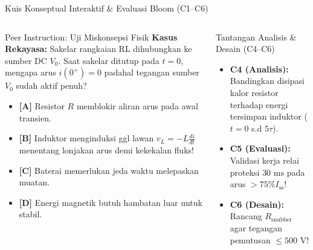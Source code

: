 \documentclass[aspectratio=169,10pt]{beamer}
\begin{document}
\begin{frame}{Kuis Konseptual Interaktif \& Evaluasi Bloom (C1--C6)}
  \begin{columns}[t]
    \begin{alertblock}{Peer Instruction: Uji Miskonsepsi Fisik}
      \footnotesize
      \textbf{Kasus Rekayasa:} Sakelar rangkaian RL dihubungkan ke sumber DC $V_0$. Saat sakelar ditutup pada $t=0$, mengapa arus $i(0^+) = 0$ padahal tegangan sumber $V_0$ sudah aktif penuh?
      \vspace{0.05cm}
      \begin{itemize}\setlength{\itemsep}{1pt}
        \item \textbf{[A]} Resistor $R$ memblokir aliran arus pada awal transien.
        \item \textbf{[B]} Induktor menginduksi ggl lawan $v_L = -L \frac{di}{dt}$ menentang lonjakan arus demi kekekalan fluks!
        \item \textbf{[C]} Baterai memerlukan jeda waktu melepaskan muatan.
        \item \textbf{[D]} Energi magnetik butuh hambatan luar untuk stabil.
      \end{itemize}
    \end{alertblock}

    \begin{block}{Tantangan Analisis \& Desain (C4--C6)}
      \footnotesize
      \begin{itemize}\setlength{\itemsep}{2pt}
        \item \textbf{C4 (Analisis):} Bandingkan disipasi kalor resistor terhadap energi tersimpan induktor ($t=0$ s.d $5\tau$).
        \item \textbf{C5 (Evaluasi):} Validasi kerja relai proteksi $30\text{ ms}$ pada arus $>75\% I_{\text{ss}}$!
        \item \textbf{C6 (Desain):} Rancang $R_{\text{snubber}}$ agar tegangan pemutusan $\le 500\text{ V}$!
      \end{itemize}
    \end{block}
  \end{columns}
\end{frame}
\end{document}
